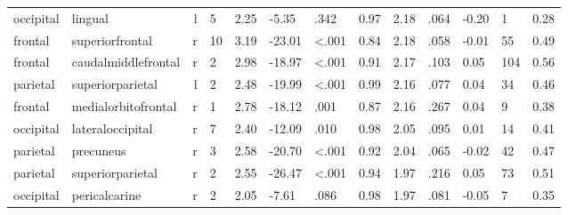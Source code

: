 \documentclass{article}
\begin{document}
\begin{longtable}{llrR{1.3cm}R{1cm}R{1.3cm}R{1cm}R{1cm}R{1.3cm}R{1cm}R{1.8cm}R{1.3cm}R{1.8cm}}
 occipital &                   lingual &    l &         5 &                  2.25 &            -5.35 &               .342 &                               0.97 &                          2.18 &                            .064 &  -0.20 &      1 &      0.28 \\
   frontal &           superiorfrontal &    r &        10 &                  3.19 &           -23.01 &      \textless.001 &                               0.84 &                          2.18 &                            .058 &  -0.01 &     55 &      0.49 \\
   frontal &       caudalmiddlefrontal &    r &         2 &                  2.98 &           -18.97 &      \textless.001 &                               0.91 &                          2.17 &                            .103 &   0.05 &    104 &      0.56 \\
  parietal &          superiorparietal &    l &         2 &                  2.48 &           -19.99 &      \textless.001 &                               0.99 &                          2.16 &                            .077 &   0.04 &     34 &      0.46 \\
   frontal &       medialorbitofrontal &    r &         1 &                  2.78 &           -18.12 &               .001 &                               0.87 &                          2.16 &                            .267 &   0.04 &      9 &      0.38 \\
 occipital &          lateraloccipital &    r &         7 &                  2.40 &           -12.09 &               .010 &                               0.98 &                          2.05 &                            .095 &   0.01 &     14 &      0.41 \\
  parietal &                 precuneus &    r &         3 &                  2.58 &           -20.70 &      \textless.001 &                               0.92 &                          2.04 &                            .065 &  -0.02 &     42 &      0.47 \\
  parietal &          superiorparietal &    r &         2 &                  2.55 &           -26.47 &      \textless.001 &                               0.94 &                          1.97 &                            .216 &   0.05 &     73 &      0.51 \\
 occipital &             pericalcarine &    r &         2 &                  2.05 &            -7.61 &               .086 &                               0.98 &                          1.97 &                            .081 &  -0.05 &      7 &      0.35 \\

\end{longtable}
\end{document}
